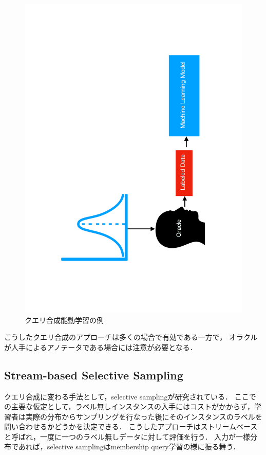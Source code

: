 \documentclass[11pt]{report}
\begin{document}
\begin{figure}[h]
\begin{center}
\includegraphics[bb=78 0 500 850, scale=0.4, angle=270]{./images/fig3.pdf}
\vspace{5mm}
\caption{クエリ合成能動学習の例}
\label{fig3}
\end{center}
\end{figure}

こうしたクエリ合成のアプローチは多くの場合で有効である一方で，
オラクルが人手によるアノテータである場合には注意が必要となる\cite{baum1992query}．

\subsection{Stream-based Selective Sampling}
クエリ合成に変わる手法として，selective sampling\cite{atlas1990training}が研究されている．
ここでの主要な仮定として，ラベル無しインスタンスの入手にはコストがかからず，学習者は実際の分布からサンプリングを行なった後にそのインスタンスのラベルを問い合わせるかどうかを決定できる．
こうしたアプローチはストリームベースと呼ばれ，一度に一つのラベル無しデータに対して評価を行う．
入力が一様分布であれば，selective samplingはmembership query学習の様に振る舞う．
\end{document}
